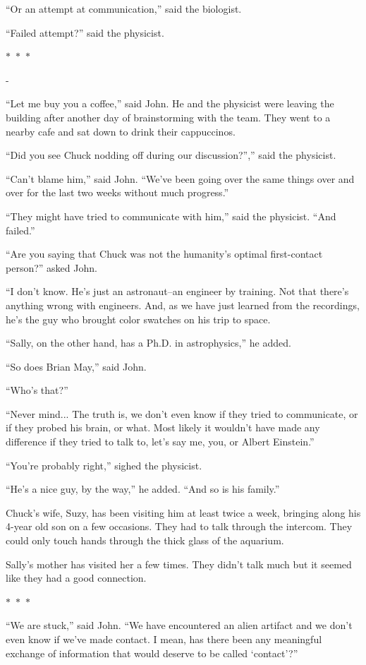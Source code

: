 \documentclass{memoir}
\newcommand{\starbreak}{%
\begin{center}
  $\ast$~$\ast$~$\ast$
\end{center}
}
\begin{document}
``Or an attempt at communication,'' said the biologist. 

``Failed attempt?'' said the physicist.

\starbreak-

``Let me buy you a coffee,'' said John. He and the physicist were leaving the building after another day of brainstorming with the team. They went to a nearby cafe and sat down to drink their cappuccinos.

``Did you see Chuck nodding off during our discussion?'','' said the physicist.

``Can't blame him,'' said John. ``We've been going over the same things over and over for the last two weeks without much progress.''

``They might have tried to communicate with him,'' said the physicist. ``And failed.''

``Are you saying that Chuck was not the humanity's optimal first-contact person?'' asked John.

``I don't know. He's just an astronaut--an engineer by training. Not that there's anything wrong with engineers. And, as we have just learned from the recordings, he's the guy who brought color swatches on his trip to space.

``Sally, on the other hand, has a Ph.D. in astrophysics,'' he added.

``So does Brian May,'' said John.

``Who's that?''

``Never mind... The truth is, we don't even know if they tried to communicate, or if they probed his brain, or what. Most likely it wouldn't have made any difference if they tried to talk to, let's say me, you, or Albert Einstein.''

``You're probably right,'' sighed the physicist.

``He's a nice guy, by the way,'' he added. ``And so is his family.'' 

Chuck's wife, Suzy, has been visiting him at least twice a week, bringing along his 4-year old son on a few occasions. They had to talk through the intercom. They could only touch hands through the thick glass of the aquarium. 

Sally's mother has visited her a few times. They didn't talk much but it seemed like they had a good connection. 

\starbreak

``We are stuck,'' said John. ``We have encountered an alien artifact and we don't even know if we've made contact. I mean, has there been any meaningful exchange of information that would deserve to be called `contact'?''
\end{document}
